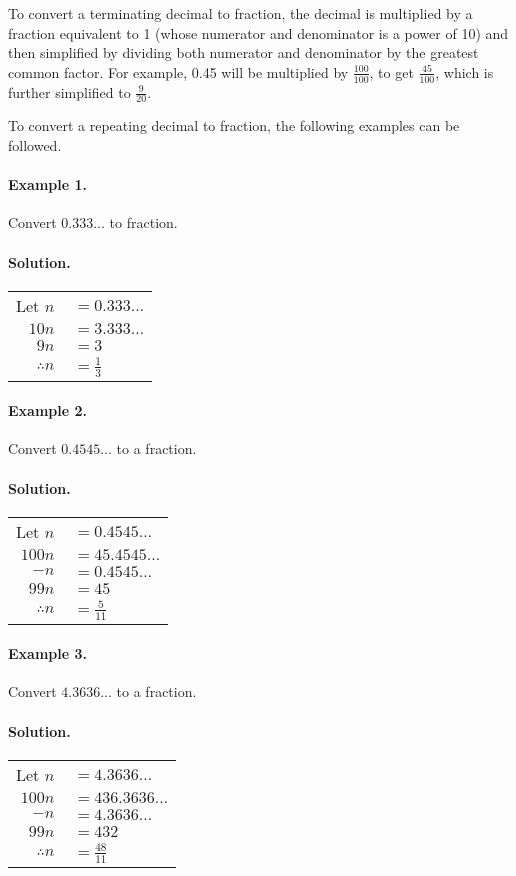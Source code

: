 To convert a terminating decimal to fraction, the decimal is multiplied by a fraction
equivalent to 1 (whose numerator and denominator is a power of 10) and then simplified by dividing
both numerator and denominator by the greatest common factor. For example, 0.45 will be
multiplied by $\frac{100}{100}$, to get $\frac{45}{100}$, which is further simplified to $\frac{9}{20}$.

To convert a repeating decimal to fraction, the following examples can be followed.

\paragraph*{Example 1.} Convert $0.333\ldots$ to fraction.
\paragraph*{Solution.} 
\begin{tabular}{r@{}l}
Let $n\,$ & $=0.333\ldots$\\
$10n\,$ & $=3.333\ldots$\\ \hline
$9n\,$ & $=3$\\
$\therefore n\,$ & $=\frac{1}{3}$\\
\end{tabular}

\paragraph*{Example 2.} Convert $0.4545\ldots$ to a fraction.
\paragraph*{Solution.}
\begin{tabular}{r@{}l}
Let $n\,$ & $= 0.4545\ldots$\\
 $100n\,$ & $= 45. 4545\ldots$\\
  $- n\,$ & $= 0.4545\ldots$\\ \hline
  $99n\,$ & $= 45$\\
  $\therefore n\,$ & $=\frac{5}{11}$\\
\end{tabular}

\paragraph*{Example 3.} Convert $4.3636\ldots$ to a fraction.
\paragraph*{Solution.}
\begin{tabular}{r@{}l}
 Let $n\,$ & $= 4.3636\ldots$\\
  $100n\,$ & $= 436.3636\ldots$\\
   $- n\,$ & $= 4.3636\ldots$\\ \hline
    $99n\,$ & $= 432$\\
   $\therefore n\,$ & $=\frac{48}{11}$\\
\end{tabular}

